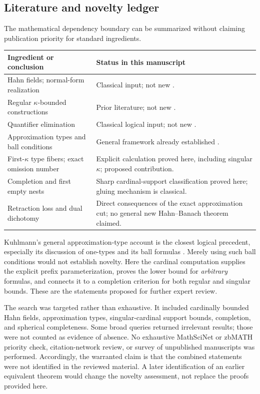 \documentclass[11pt,letterpaper]{article}
\numberwithin{equation}{section}
\theoremstyle{definition}
\theoremstyle{remark}
\begin{document}
\subsection{Literature and novelty ledger}
The mathematical dependency boundary can be summarized without claiming publication priority for standard ingredients.

\begin{center}
\small
\begin{tabular}{@{}p{}p{}@{}}
\toprule
Ingredient or conclusion & Status in this manuscript \\
\midrule
Hahn fields; normal-form realization & Classical input; not new \cite{Poonen,Gonshor}.\\[0.4em]
Regular $\kappa$-bounded constructions & Prior literature; not new \cite{KS,BKMM}.\\[0.4em]
Quantifier elimination & Classical logical input; not new \cite{Tarski,Robinson,Yin}.\\[0.4em]
Approximation types and ball conditions & General framework already established \cite{FK}.\\[0.4em]
First-$\kappa$ type fibers; exact omission number & Explicit calculation proved here, including singular $\kappa$; proposed contribution.\\[0.4em]
Completion and first empty nests & Sharp cardinal-support classification proved here; gluing mechanism is classical.\\[0.4em]
Retraction loss and dual dichotomy & Direct consequences of the exact approximation cut; no general new Hahn--Banach theorem claimed.\\
\bottomrule
\end{tabular}
\end{center}

Kuhlmann's general approximation-type account is the closest logical precedent, especially its discussion of one-types and its ball formulas \cite[Section~4.2]{FK}. Merely using such ball conditions would not establish novelty. Here the cardinal computation supplies the explicit prefix parameterization, proves the lower bound for \emph{arbitrary} formulas, and connects it to a completion criterion for both regular and singular bounds. These are the statements proposed for further expert review.

The search was targeted rather than exhaustive. It included cardinally bounded Hahn fields, approximation types, singular-cardinal support bounds, completion, and spherical completeness. Some broad queries returned irrelevant results; those were not counted as evidence of absence. No exhaustive MathSciNet or zbMATH priority check, citation-network review, or survey of unpublished manuscripts was performed. Accordingly, the warranted claim is that the combined statements were not identified in the reviewed material. A later identification of an earlier equivalent theorem would change the novelty assessment, not replace the proofs provided here.
\end{document}
